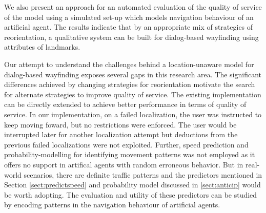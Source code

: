 \documentclass{iitkthesis}
\begin{document}
We also present an approach for an automated evaluation of the 
quality of service of the model using a simulated set-up which models 
navigation behaviour of an artificial agent. The results indicate that by 
an appropriate mix of strategies of reorientation, a qualitative system 
can be built for dialog-based wayfinding using attributes of landmarks.

Our attempt to understand the challenges behind a location-unaware model 
for dialog-based wayfinding exposes several gaps in this research area. 
The significant differences achieved by changing strategies for 
reorientation motivate the search for alternate strategies to improve 
quality of service. The existing implementation can be directly extended 
to achieve better performance in terms of quality of service. In our 
implementation, on a failed localization, the user was instructed to keep 
moving foward, but no restrictions were enforced. The user would be 
interrupted later for another localization attempt but deductions from 
the previous failed localizations were not exploited. Further, 
speed prediction and probability-modelling for identifying movement 
patterns was not employed as it offers no support in artifical agents 
with random erroneous behavior. But in real-world scenarios, there are 
definite traffic patterns and the predictors mentioned in Section 
\ref{sect:predictspeed} and probability model discussed in 
\ref{sect:anticip} would be worth adopting. The evaluation and 
utility of these predictors can be studied by encoding patterns in the 
navigation behaviour of artificial agents.  
 


\end{document}
